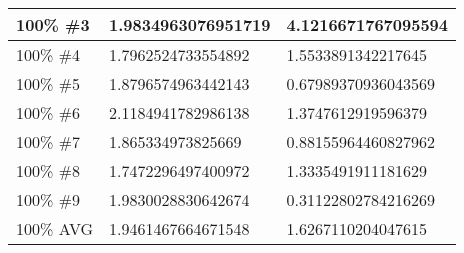 \begin{longtable}{ | X | X | X | }
	100\% \#3 & 1.9834963076951719 & 4.1216671767095594 \\ \hline
	100\% \#4 & 1.7962524733554892 & 1.5533891342217645 \\ \hline
	100\% \#5 & 1.8796574963442143 & 0.67989370936043569 \\ \hline
	100\% \#6 & 2.1184941782986138 & 1.3747612919596379 \\ \hline
	100\% \#7 & 1.865334973825669 & 0.88155964460827962 \\ \hline
	100\% \#8 & 1.7472296497400972 & 1.3335491911181629 \\ \hline
	100\% \#9 & 1.9830028830642674 & 0.31122802784216269 \\ \hline
	100\% AVG & 1.9461467664671548 & 1.6267110204047615 \\ \hline
\end{longtable}
